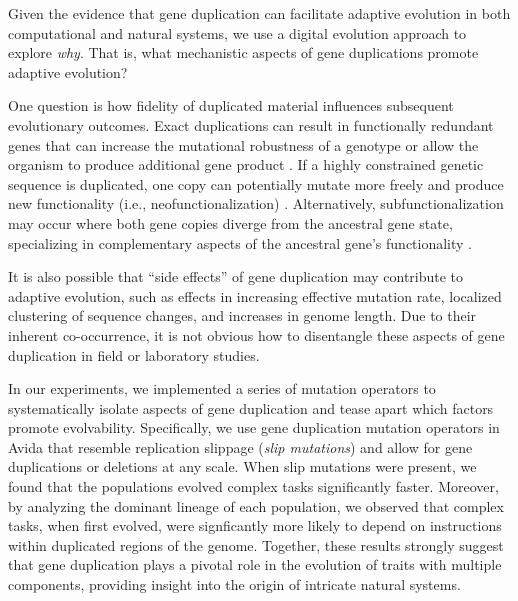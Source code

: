 Given the evidence that gene duplication can facilitate adaptive evolution in both computational and natural systems, we use a digital evolution approach to explore \textit{why}.
That is, what mechanistic aspects of gene duplications promote adaptive evolution?

One question is how fidelity of duplicated material influences subsequent evolutionary outcomes.
Exact duplications can result in functionally redundant genes that can increase the mutational robustness of a genotype \citep{Crow:2006role} or allow the organism to produce additional gene product \citep{Zhang:2003fw}.
If a highly constrained genetic sequence is duplicated, one copy can potentially mutate more freely and produce new functionality (i.e., neofunctionalization) \citep{Zhang:2003fw,Wagner:2003fk}.
Alternatively, subfunctionalization may occur where both gene copies diverge from the ancestral gene state, specializing in complementary aspects of the ancestral gene's functionality \citep{Zhang:2003fw}.

It is also possible that ``side effects'' of gene duplication may contribute to adaptive evolution, such as effects in increasing effective mutation rate, localized clustering of sequence changes, and increases in genome length.
Due to their inherent co-occurrence, it is not obvious how to disentangle these aspects of gene duplication in field or laboratory studies.


In our experiments, we implemented a series of mutation operators to systematically isolate aspects of gene duplication and tease apart which factors promote evolvability.
Specifically, we use gene duplication mutation operators in Avida that resemble replication slippage \citep{bzymek_instability_2001} (\textit{slip mutations}) and allow for gene duplications or deletions at any scale.
When slip mutations were present, we found that the populations evolved complex tasks significantly faster.
Moreover, by analyzing the dominant lineage of each population, we observed that complex tasks, when first evolved, were signficantly more likely to depend on instructions within duplicated regions of the genome.
Together, these results strongly suggest that gene duplication plays a pivotal role in the evolution of traits with multiple components, providing insight into the origin of intricate natural systems.



